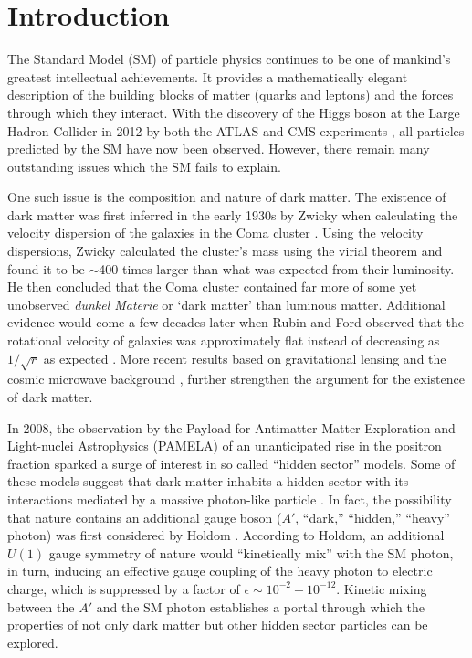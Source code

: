 
\chapter{Introduction}

The Standard Model (SM) of particle physics continues to be one of mankind's 
greatest intellectual achievements.  It provides a mathematically elegant 
description of the building blocks of matter (quarks and leptons) and the 
forces through which they interact.  With the discovery of the Higgs boson at the
Large Hadron Collider in 2012 by both the ATLAS and CMS experiments
\cite{Aad:2012tfa, Chatrchyan:2012xdj}, all particles predicted by the SM have
now been observed.  However, there remain many outstanding issues which the SM
fails to explain.  

One such issue is the composition and nature of dark matter. The 
existence of dark matter was first inferred in the early 1930s by Zwicky when
calculating the velocity dispersion of the galaxies in the Coma cluster 
\cite{Zwicky:1933gu}.  Using the velocity dispersions, Zwicky calculated the 
cluster's mass using the virial theorem and found it to be $\sim$400 times 
larger than what was expected from their luminosity.  He then concluded that 
the Coma cluster contained far more of some yet unobserved \emph{dunkel Materie}
or `dark matter' than luminous matter.  Additional evidence would come 
a few decades later when Rubin and Ford observed that the rotational velocity
of galaxies was approximately flat instead of decreasing as $1/\sqrt{r}$ as 
expected \cite{Rubin:1980zd}.  More recent results based on gravitational
lensing \cite{Clowe:2006eq} and the cosmic microwave background 
\cite{Adam:2015rua}, further strengthen the argument for the existence of dark 
matter.

In 2008, the observation by the Payload for Antimatter Matter Exploration and 
Light-nuclei Astrophysics (PAMELA) of an unanticipated rise in the positron 
fraction \cite{Adriani:2008zr} sparked a surge of interest in so called 
``hidden sector'' models.  Some of these models suggest that dark matter 
inhabits a hidden sector with its interactions mediated by a massive 
photon-like particle \cite{ArkaniHamed:2008qn, Pospelov:2008jd, Hooper:2012cw}.
In fact, the possibility that nature contains an 
additional gauge boson  ($A'$, ``dark,'' ``hidden,'' ``heavy'' photon) was 
first considered by Holdom \cite{Holdom:1985ag}.  According to Holdom, 
an additional $U(1)$ gauge
symmetry of nature would ``kinetically mix'' with the SM photon, in turn, 
inducing an effective gauge coupling of the heavy photon to electric charge, 
which is suppressed by a factor of $\epsilon \sim 10^{-2} - 10^{-12}$.  
Kinetic mixing between the $A'$ and the SM photon establishes a portal through which
the properties of not only dark matter but other hidden sector particles can be
explored.

